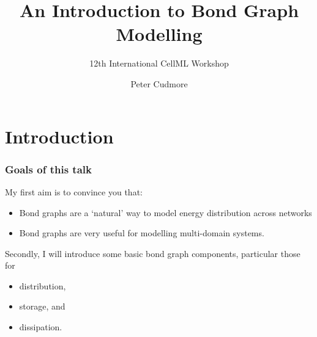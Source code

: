 \documentclass[11pt,reqno]{beamer}
\title{An Introduction to Bond Graph Modelling}
\subtitle{12th International CellML Workshop}
\author{Peter Cudmore}
\institute{Systems Biology Lab, The University of Melbourne}
\begin{document}
	\begin{frame}
	\titlepage
	\addtocounter{framenumber}{-1} 
\end{frame}
\section{Introduction}
\begin{frame}
\frametitle{Goals of this talk}
My first aim is to convince you that:
\begin{itemize}
	\item Bond graphs are a `natural' way to model energy distribution across networks
	\item Bond graphs are very useful for modelling multi-domain systems.
\end{itemize}

\vspace{10pt}

Secondly, I will introduce some basic bond graph components, particular those for
\begin{itemize}
	\item distribution,
	\item storage, and
	\item dissipation.
\end{itemize}

\end{frame}
\end{document}

